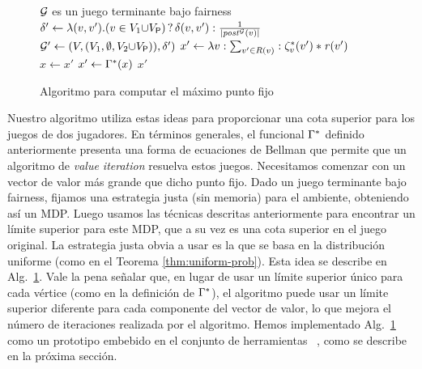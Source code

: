 \begin{figure}
    \centering
    \begin{minipage}{0.75\textwidth}
      \begin{algorithm}[H]
      \SetAlgoLined
      \KwOut{$\nu \Bellman$}
        \caption{Algoritmo para computar el máximo punto fijo}\label{Alg:gfp}
        \begin{algorithmic}
          \REQUIRE $\mathcal{G}$ es un juego terminante bajo fairness\\[1ex]
          \STATE $\delta' \gets  \lambda (v,v') {.} (v \in V_1 {\cup} V_{\mathsf{P}}) \mathop{?} \delta(v,v') : \frac{1}{|\mathit{post}^{\mathcal{G}}(v)|}$\\[-1ex]
          \STATE  $\mathcal{G}' \gets (V, (V_1, \emptyset, V_2{\cup}V_{\mathsf{P}})), \delta')$
          \STATE $x' \gets \lambda v : \sum_{v' \in R(v)} : \zeta^*_v(v')*\mathit{r}(v')$
          \REPEAT
          \STATE $x \gets x'$
          \STATE $x' \gets \Gamma^*(x)$
          \RETURN $x'$
        \end{algorithmic}
      \end{algorithm}
    \end{minipage}
  \end{figure}
    Nuestro algoritmo utiliza estas ideas para proporcionar una cota superior para los juegos de dos jugadores. En términos generales, el funcional $\Gamma^*$ definido anteriormente presenta una forma de ecuaciones de Bellman que permite que un algoritmo de \emph{value iteration} resuelva estos juegos. Necesitamos comenzar con un vector de valor más grande que dicho punto fijo. Dado un juego terminante bajo fairness, fijamos una estrategia justa (sin memoria) para el ambiente, obteniendo así un MDP. Luego usamos las técnicas descritas anteriormente para encontrar un límite superior para este MDP, que a su vez es una cota superior en el juego original. La estrategia justa obvia a usar es la que se basa en la distribución uniforme (como en el Teorema \ref{thm:uniform-prob}). Esta idea se describe en Alg.~\ref{Alg:gfp}. Vale la pena señalar que, en lugar de usar un límite superior único para cada vértice (como en la definición de $\Gamma^*$), el algoritmo puede usar un límite superior diferente para cada componente del vector de valor, lo que mejora el número de iteraciones realizada por el algoritmo.
Hemos implementado Alg.~\ref{Alg:gfp} como un prototipo embebido en el conjunto de herramientas {\PrismGames} ~\cite{DBLP:conf/cav/KwiatkowskaN0S20}, 
como se describe en la próxima sección. 



